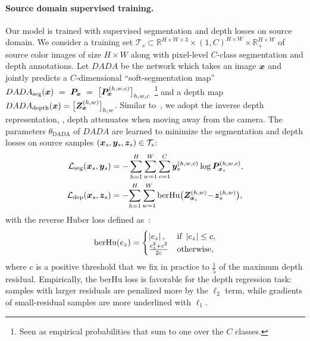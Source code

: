 \documentclass[10pt,twocolumn,letterpaper]{article}
\newcommand{\src}[1]{#1_s}
\newcommand{\bx}{\mm x}
\newcommand{\seg}{\mathrm{seg}}
\newcommand{\dep}{\mathrm{dep}}
\begin{document}
\vspace{-0.3cm}
\paragraph{Source domain supervised training.} Our model is trained with supervised segmentation and depth losses on source domain.
We consider a training set $\src{\mathcal{T}}\subset  \mathbb{R}^{H\times W\times 3} \times (1,C) ^{H\times W} \times  \mathbb{R}_{+} ^{H\times W}$ of source color images of size $H\times W$ along with pixel-level $C$-class segmentation and depth annotations. 
Let $DADA$ be the network which takes an image $\bm{x}$ and jointly predicts a $C$-dimensional ``soft-segmentation map'' $DADA_{\mathrm{seg}}(\bx)~=~\mm P_{\mm x}~=~\big[ \mm P_{\mm x}^{(h,w,c)} \big]_{h,w,c}$~\footnote{Seen as empirical probabilities that sum to one over the $C$ classes.} and a depth map $DADA_{\mathrm{depth}}(\bx)=\big[ \mm Z_{\mm x}^{(h,w)} \big]_{h,w}$.
Similar to~\cite{kendall2017multitask}, we adopt the inverse depth representation, \ie, depth attenuates when moving away from the camera.
The parameters $\theta_{\mathrm{DADA}}$ of $DADA$ are learned to minimize the segmentation and depth losses on source samples $(\src{\mm x}, \src{\mm y}, \src{\mm z}) \in \mathcal{T}_s$:
\begin{align}\label{eq:mtlloss}
\vspace{-0.06cm}
\mathcal{L}_{\seg}(\src{\mm x}, \src{\mm y})&=-\sum_{h=1}^H\sum_{w=1}^W\sum_{c=1}^{C} \src{\mm y}^{(h,w,c)} \log \mm P_{\src{\mm x}}^{(h,w,c)},\\
\mathcal{L}_{\dep}(\src{\mm x}, \src{\mm z})&=-\!\sum_{h=1}^H\sum_{w=1}^W \text{berHu}\big(\mm Z_{\src{\mm x}}^{(h,w)}\!-\!\src{\mm z}^{(h,w)}\big),
\vspace{-0.06cm}
\end{align}
with the reverse Huber loss defined as~\cite{laina2016deeper}:
\begin{equation}
\vspace{-0.06cm}
\text{berHu}(e_z)=\begin{cases}
\left|e_z\right|,& \text{if } \left|e_z\right|\leq c,\\
\frac{e_z^2+c^2}{2c}              & \text{otherwise},
\end{cases}
\vspace{-0.06cm}
\end{equation}
where $c$ is a positive threshold that we fix in practice to $\frac{1}{5}$ of the maximum depth residual.
Empirically, the berHu loss is favorable for the depth regression task: samples with larger residuals are penalized more by the $\ell_2$ term, while gradients of small-residual samples are more underlined with $\ell_1$.
\end{document}
